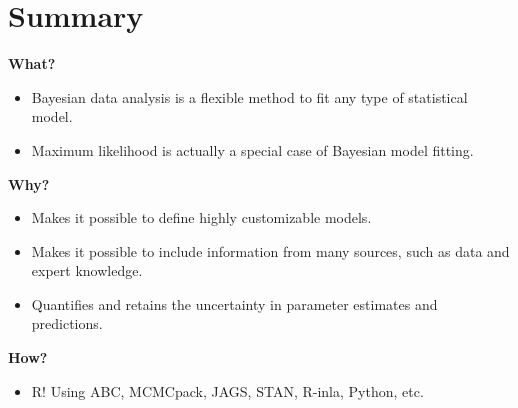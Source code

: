 \newpage
\section{Summary}
\begin{description}
	\item \textbf{What?}
	   \begin{itemize}
		   \item Bayesian data analysis is a flexible method to fit any type of statistical model. 
			 \item Maximum likelihood is actually a special case of Bayesian model fitting.
	   \end{itemize}
	\item \textbf{Why?}
			\begin{itemize}
				\item Makes it possible to define highly customizable models.
				\item Makes it possible to include information from many sources, such as data and expert knowledge.
				\item Quantifies and retains the uncertainty in parameter estimates and predictions.
			\end{itemize}
	\item \textbf{How?}
	\begin{itemize}
	       \item R! Using ABC, MCMCpack, JAGS, STAN, R-inla, Python, etc.
	       \end{itemize}
\end{description}

\appendix

